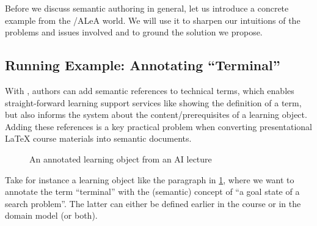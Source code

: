\documentclass{llncs}
\newcommand\ALeA{\textsf{ALeA}\xspace}
\begin{document}
Before we discuss semantic authoring in general, let us introduce a concrete example from
the \sTeX/\ALeA world. We will use it to sharpen our intuitions of the problems and issues
involved and to ground the solution we propose.

\subsection{Running Example: Annotating  ``Terminal''}
With \sTeX, authors can add semantic references to technical terms,
which enables straight-forward learning support services like
showing the definition of a term, but also informs the system
about the content/prerequisites of a learning object.
Adding these references is a key practical problem when converting presentational {\LaTeX}
course materials into semantic documents.

\begin{figure}[ht]\centering
  \caption{An annotated learning object from an AI lecture}\label{fig:lo}
\end{figure}

Take for instance a learning object like the paragraph in \cref{fig:lo}, where we want to annotate
the term ``terminal'' with the (semantic) concept of ``a goal state of a search
problem''. The latter can either be defined earlier in the course or in the domain model
(or both).



\end{document}
